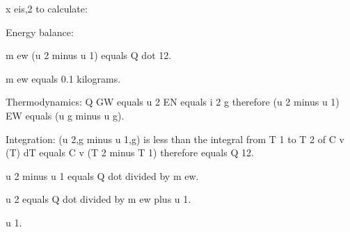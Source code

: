 x eis,2 to calculate:

Energy balance:

m ew (u 2 minus u 1) equals Q dot 12.

m ew equals 0.1 kilograms.

Thermodynamics: Q GW equals u 2 EN equals i 2 g therefore (u 2 minus u 1) EW equals (u g minus u g).

Integration: (u 2,g minus u 1,g) is less than the integral from T 1 to T 2 of C v (T) dT equals C v (T 2 minus T 1) therefore equals Q 12.

u 2 minus u 1 equals Q dot divided by m ew.

u 2 equals Q dot divided by m ew plus u 1.

u 1.